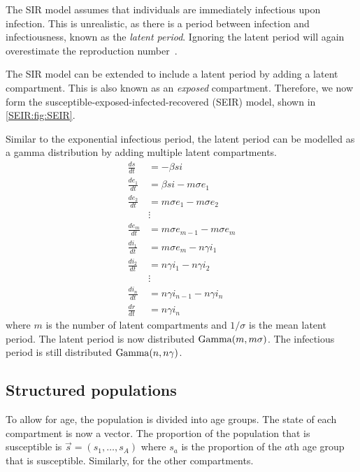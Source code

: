 \documentclass[thesis.tex]{subfiles}
\begin{document}
The SIR model assumes that individuals are immediately infectious upon infection.
This is unrealistic, as there is a period between infection and infectiousness, known as the \emph{latent period}.
Ignoring the latent period will again overestimate the reproduction number~\autocite{wearingAppropriate}.

The SIR model can be extended to include a latent period by adding a latent compartment.
This is also known as an \emph{exposed} compartment.
Therefore, we now form the susceptible-exposed-infected-recovered (SEIR) model, shown in \cref{SEIR:fig:SEIR}.

Similar to the exponential infectious period, the latent period can be modelled as a gamma distribution by adding multiple latent compartments.
\begin{align}
\frac{ds}{dt} &= -\beta si \\
\frac{de_1}{dt} &= \beta si - m\sigma e_1 \\
\frac{de_2}{dt} &= m\sigma e_1 - m \sigma e_2 \\
&\vdots \nonumber \\
\frac{de_m}{dt} &= m\sigma e_{m-1} - m \sigma e_m \\
\frac{di_1}{dt} &= m\sigma e_m - n\gamma i_1 \\
\frac{di_2}{dt} &= n\gamma i_1 - n \gamma i_2 \\
&\vdots \nonumber \\
\frac{di_n}{dt} &= n\gamma i_{n-1} - n \gamma i_n \\
\frac{dr}{dt} &= n\gamma i_n
\end{align}
where $m$ is the number of latent compartments and $1/\sigma$ is the mean latent period.
The latent period is now distributed $\operatorname{Gamma}(m, m\sigma)$.
The infectious period is still distributed $\operatorname{Gamma}(n, n\gamma)$.


\subsection{Structured populations} \label{SEIR:sec:structured-populations}


To allow for age, the population is divided into age groups.
The state of each compartment is now a vector.
The proportion of the population that is susceptible is $\vec{s} = (s_1, \dots, s_A)$ where $s_a$ is the proportion of the $a$th age group that is susceptible.
Similarly, for the other compartments.
\end{document}

